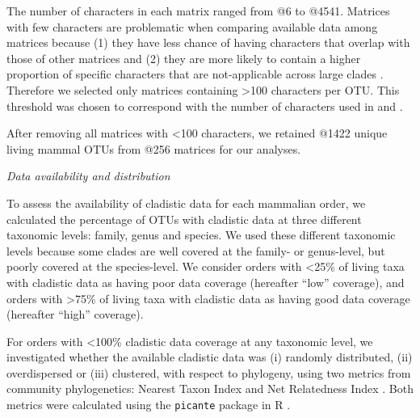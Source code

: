 \documentclass[12pt,letterpaper]{article}
\renewcommand{\subsection}[1]{%
\bigskip
\begin{center}
\begin{large}
\normalfont\itshape #1
\end{large}
\end{center}}
\begin{document}
The number of characters in each matrix ranged from @6 to @4541.
Matrices with few characters %
are problematic when comparing available data among matrices because (1) they have less chance of having characters that overlap with those of other matrices \citep{wagner2000} and (2) they are more likely to contain a higher proportion of specific characters that are not-applicable across large clades \citep[][e.g. ``antler ramifications'' is a character that is only applicable to Cervidae not all mammals]{Brazeau2011}.
Therefore we selected only matrices containing \textgreater 100 characters per OTU.
This threshold was chosen to correspond with the number of characters used in \citet{GuillermeCooper} and \citet{harrisonamong-character2014}.

After removing all matrices with \textless 100 characters, we retained @1422 unique living mammal OTUs from @256 matrices for our analyses.

\subsection{Data availability and distribution}
To assess the availability of cladistic data for each mammalian order, we calculated the percentage of OTUs with cladistic data at three different taxonomic levels: family, genus and species.
We used these different taxonomic levels because some clades are well covered at the family- or genus-level, but poorly covered at the species-level.
We consider orders with \textless 25\% of living taxa with cladistic data as having poor data coverage (hereafter ``low'' coverage), and orders with \textgreater 75\% of living taxa with cladistic data as having good data coverage (hereafter ``high'' coverage). 

For orders with \textless 100\% cladistic data coverage at any taxonomic level, we investigated whether the available cladistic data was (i) randomly distributed, (ii) overdispersed or (iii) clustered, with respect to phylogeny, using two metrics from community phylogenetics: Nearest Taxon Index \citep[NTI;][]{webb2002phylogenies} and Net Relatedness Index \citep[NRI;][]{webb2002phylogenies}. 
Both metrics were calculated using the \texttt{picante} package in R \citep{picante,R}.
\end{document}
